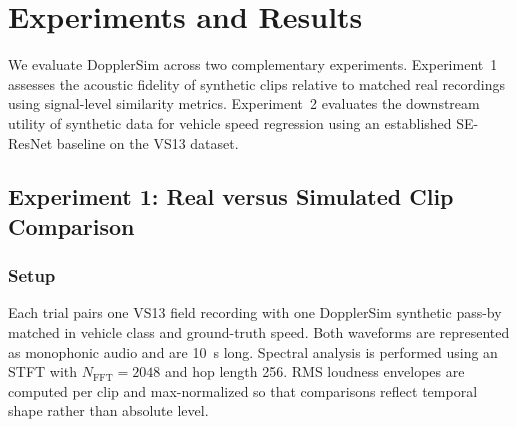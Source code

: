 \documentclass{article}
\begin{document}
\section{Experiments and Results}
\label{sec:experiments}

We evaluate DopplerSim across two complementary experiments. Experiment~1 assesses the acoustic fidelity of synthetic clips relative to matched real recordings using signal-level similarity metrics. Experiment~2 evaluates the downstream utility of synthetic data for vehicle speed regression using an established SE-ResNet baseline on the VS13 dataset.

\subsection{Experiment 1: Real versus Simulated Clip Comparison}
\label{sec:exp1}

\subsubsection{Setup}

Each trial pairs one VS13 field recording with one DopplerSim synthetic pass-by matched in vehicle class and ground-truth speed. Both waveforms are represented as monophonic audio and are \SI{10}{\second} long. Spectral analysis is performed using an STFT with $N_{\mathrm{FFT}} = 2048$ and hop length \num{256}. RMS loudness envelopes are computed per clip and max-normalized so that comparisons reflect temporal shape rather than absolute level.
\end{document}
